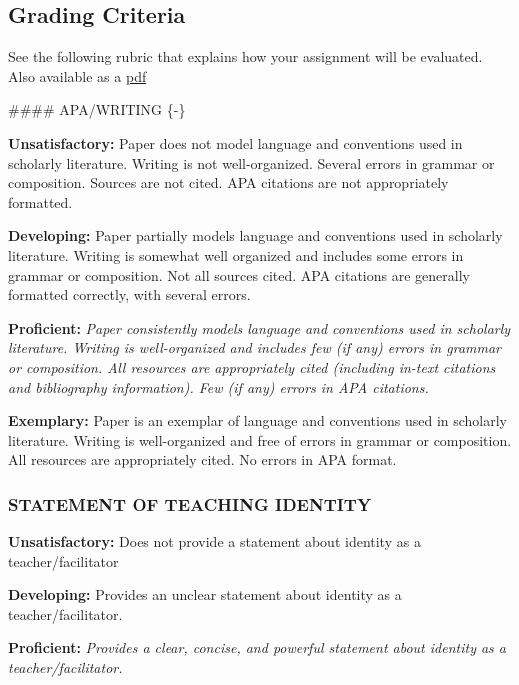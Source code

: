 \documentclass[
]{book}
\begin{document}
\hypertarget{grading-criteria}{%
\subsection*{Grading Criteria}\label{grading-criteria}}

See the following rubric that explains how your assignment will be evaluated. Also available as a \href{assets/assessment/Identity-as-a-Teacher-RUBRIC.pdf}{pdf}

\#\#\#\# APA/WRITING \{-\}

\textbf{Unsatisfactory:} Paper does not model language and conventions used in scholarly literature. Writing is not well-organized. Several errors in grammar or composition. Sources are not cited. APA citations are not appropriately formatted.

\textbf{Developing:} Paper partially models language and conventions used in scholarly literature. Writing is somewhat well organized and includes some errors in grammar or composition. Not all sources cited. APA citations are generally formatted correctly, with several errors.

\textbf{Proficient:} \emph{Paper consistently models language and conventions used in scholarly literature. Writing is well-organized and includes few (if any) errors in grammar or composition. All resources are appropriately cited (including in-text citations and bibliography information). Few (if any) errors in APA citations.}

\textbf{Exemplary:} Paper is an exemplar of language and conventions used in scholarly literature. Writing is well-organized and free of errors in grammar or composition. All resources are appropriately cited. No errors in APA format.

\hypertarget{statement-of-teaching-identity}{%
\subsubsection*{STATEMENT OF TEACHING IDENTITY}\label{statement-of-teaching-identity}}

\textbf{Unsatisfactory:} Does not provide a statement about identity as a teacher/facilitator

\textbf{Developing:} Provides an unclear statement about identity as a teacher/facilitator.

\textbf{Proficient:} \emph{Provides a clear, concise, and powerful statement about identity as a teacher/facilitator.}
\end{document}

